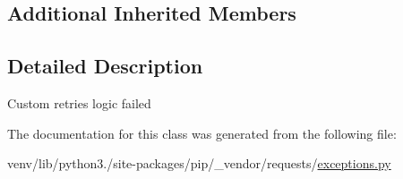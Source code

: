\subsection*{Additional Inherited Members}


\subsection{Detailed Description}
\begin{DoxyVerb}Custom retries logic failed\end{DoxyVerb}
 

The documentation for this class was generated from the following file\+:\begin{DoxyCompactItemize}
\item 
venv/lib/python3./site-\/packages/pip/\+\_\+vendor/requests/\hyperlink{pip_2__vendor_2requests_2exceptions_8py}{exceptions.\+py}\end{DoxyCompactItemize}
